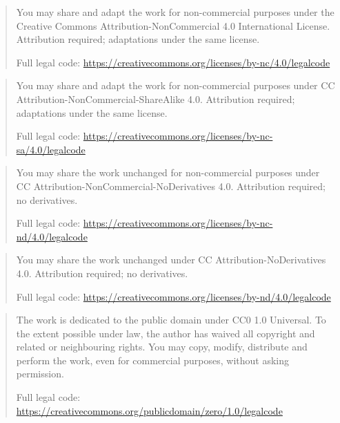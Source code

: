 \expandafter\def\csname qdissertation@licensetext@CC-BY-NC-4.0\endcsname{%
  \begin{quote}\small\raggedright
    You may share and adapt the work for non-commercial purposes under the Creative Commons Attribution-NonCommercial 4.0 International License. Attribution required; adaptations under the same license.

    Full legal code: \url{https://creativecommons.org/licenses/by-nc/4.0/legalcode}
  \end{quote}%
}
\expandafter\def\csname qdissertation@licensetext@CC-BY-NC-SA-4.0\endcsname{%
  \begin{quote}\small\raggedright
    You may share and adapt the work for non-commercial purposes under CC Attribution-NonCommercial-ShareAlike 4.0. Attribution required; adaptations under the same license.

    Full legal code: \url{https://creativecommons.org/licenses/by-nc-sa/4.0/legalcode}
  \end{quote}%
}
\expandafter\def\csname qdissertation@licensetext@CC-BY-NC-ND-4.0\endcsname{%
  \begin{quote}\small\raggedright
    You may share the work unchanged for non-commercial purposes under CC Attribution-NonCommercial-NoDerivatives 4.0. Attribution required; no derivatives.

    Full legal code: \url{https://creativecommons.org/licenses/by-nc-nd/4.0/legalcode}
  \end{quote}%
}
\expandafter\def\csname qdissertation@licensetext@CC-BY-ND-4.0\endcsname{%
  \begin{quote}\small\raggedright
    You may share the work unchanged under CC Attribution-NoDerivatives 4.0. Attribution required; no derivatives.

    Full legal code: \url{https://creativecommons.org/licenses/by-nd/4.0/legalcode}
  \end{quote}%
}
\expandafter\def\csname qdissertation@licensetext@CC0-1.0\endcsname{%
  \begin{quote}\small\raggedright
    The work is dedicated to the public domain under CC0 1.0 Universal. To the extent possible under law, the author has waived all copyright and related or neighbouring rights. You may copy, modify, distribute and perform the work, even for commercial purposes, without asking permission.

    Full legal code: \url{https://creativecommons.org/publicdomain/zero/1.0/legalcode}
  \end{quote}%
}

